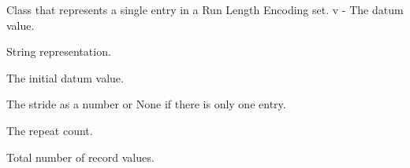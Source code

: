 \documentclass[letterpaper,10pt,english]{sphinxmanual}
\begin{document}
\begin{fulllineitems}
\label{\detokenize{ref/LIS/core/Rle:TotalDepth.LIS.core.Rle.RLEItem}}
Class that represents a single entry in a Run Length Encoding set. v - The datum value.

\begin{fulllineitems}
\label{\detokenize{ref/LIS/core/Rle:TotalDepth.LIS.core.Rle.RLEItem.__str__}}
String representation.

\end{fulllineitems}


\begin{fulllineitems}
\label{\detokenize{ref/LIS/core/Rle:TotalDepth.LIS.core.Rle.RLEItem.datum}}
The initial datum value.

\end{fulllineitems}


\begin{fulllineitems}
\label{\detokenize{ref/LIS/core/Rle:TotalDepth.LIS.core.Rle.RLEItem.stride}}
The stride as a number or None if there is only one entry.

\end{fulllineitems}


\begin{fulllineitems}
\label{\detokenize{ref/LIS/core/Rle:TotalDepth.LIS.core.Rle.RLEItem.repeat}}
The repeat count.

\end{fulllineitems}


\begin{fulllineitems}
\label{\detokenize{ref/LIS/core/Rle:TotalDepth.LIS.core.Rle.RLEItem.numValues}}
Total number of record values.

\end{fulllineitems}


\end{fulllineitems}
\end{document}

